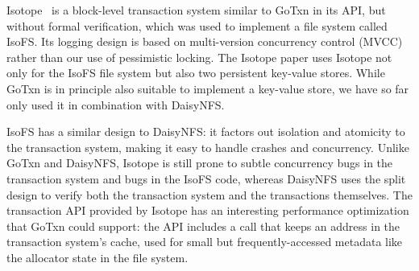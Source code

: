 Isotope~\cite{shin:isotope} is a block-level transaction system similar to GoTxn
in its API, but without formal verification, which was used to implement a file
system called IsoFS. Its logging design is based on
multi-version concurrency control (MVCC)~\cite{bernstein:concurrency-dbs} rather than our use of pessimistic
locking. The Isotope paper uses Isotope not only for the IsoFS file system but
also two persistent key-value stores. While GoTxn is in principle also suitable to implement a
key-value store, we have so far only used it in combination with DaisyNFS.\@

IsoFS has a similar design to DaisyNFS: it factors out isolation and atomicity to the transaction
system, making it easy to handle crashes and concurrency. Unlike GoTxn and
DaisyNFS, Isotope is still prone to subtle concurrency bugs in the transaction
system and bugs in the IsoFS code, whereas DaisyNFS uses the split design to
verify both the transaction system and the transactions themselves. The transaction API provided
by Isotope has an interesting performance optimization that GoTxn could support:
the API includes a  call that keeps an address in the
transaction system's cache, used for small but frequently-accessed metadata like
the allocator state in the file system.
